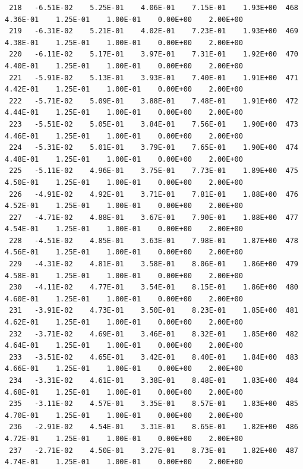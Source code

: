 \documentclass[10pt,letterpaper,notitlepage]{article}
\numberwithin{equation}{section}
\begin{document}
\begin{appendices}
{\begin{verbatim}
 218   -6.51E-02    5.25E-01    4.06E-01    7.15E-01    1.93E+00  468    4.36E-01    1.25E-01    1.00E-01    0.00E+00    2.00E+00
 219   -6.31E-02    5.21E-01    4.02E-01    7.23E-01    1.93E+00  469    4.38E-01    1.25E-01    1.00E-01    0.00E+00    2.00E+00
 220   -6.11E-02    5.17E-01    3.97E-01    7.31E-01    1.92E+00  470    4.40E-01    1.25E-01    1.00E-01    0.00E+00    2.00E+00
 221   -5.91E-02    5.13E-01    3.93E-01    7.40E-01    1.91E+00  471    4.42E-01    1.25E-01    1.00E-01    0.00E+00    2.00E+00
 222   -5.71E-02    5.09E-01    3.88E-01    7.48E-01    1.91E+00  472    4.44E-01    1.25E-01    1.00E-01    0.00E+00    2.00E+00
 223   -5.51E-02    5.05E-01    3.84E-01    7.56E-01    1.90E+00  473    4.46E-01    1.25E-01    1.00E-01    0.00E+00    2.00E+00
 224   -5.31E-02    5.01E-01    3.79E-01    7.65E-01    1.90E+00  474    4.48E-01    1.25E-01    1.00E-01    0.00E+00    2.00E+00
 225   -5.11E-02    4.96E-01    3.75E-01    7.73E-01    1.89E+00  475    4.50E-01    1.25E-01    1.00E-01    0.00E+00    2.00E+00
 226   -4.91E-02    4.92E-01    3.71E-01    7.81E-01    1.88E+00  476    4.52E-01    1.25E-01    1.00E-01    0.00E+00    2.00E+00
 227   -4.71E-02    4.88E-01    3.67E-01    7.90E-01    1.88E+00  477    4.54E-01    1.25E-01    1.00E-01    0.00E+00    2.00E+00
 228   -4.51E-02    4.85E-01    3.63E-01    7.98E-01    1.87E+00  478    4.56E-01    1.25E-01    1.00E-01    0.00E+00    2.00E+00
 229   -4.31E-02    4.81E-01    3.58E-01    8.06E-01    1.86E+00  479    4.58E-01    1.25E-01    1.00E-01    0.00E+00    2.00E+00
 230   -4.11E-02    4.77E-01    3.54E-01    8.15E-01    1.86E+00  480    4.60E-01    1.25E-01    1.00E-01    0.00E+00    2.00E+00
 231   -3.91E-02    4.73E-01    3.50E-01    8.23E-01    1.85E+00  481    4.62E-01    1.25E-01    1.00E-01    0.00E+00    2.00E+00
 232   -3.71E-02    4.69E-01    3.46E-01    8.32E-01    1.85E+00  482    4.64E-01    1.25E-01    1.00E-01    0.00E+00    2.00E+00
 233   -3.51E-02    4.65E-01    3.42E-01    8.40E-01    1.84E+00  483    4.66E-01    1.25E-01    1.00E-01    0.00E+00    2.00E+00
 234   -3.31E-02    4.61E-01    3.38E-01    8.48E-01    1.83E+00  484    4.68E-01    1.25E-01    1.00E-01    0.00E+00    2.00E+00
 235   -3.11E-02    4.57E-01    3.35E-01    8.57E-01    1.83E+00  485    4.70E-01    1.25E-01    1.00E-01    0.00E+00    2.00E+00
 236   -2.91E-02    4.54E-01    3.31E-01    8.65E-01    1.82E+00  486    4.72E-01    1.25E-01    1.00E-01    0.00E+00    2.00E+00
 237   -2.71E-02    4.50E-01    3.27E-01    8.73E-01    1.82E+00  487    4.74E-01    1.25E-01    1.00E-01    0.00E+00    2.00E+00

\end{verbatim}}
\end{appendices}
\end{document}
